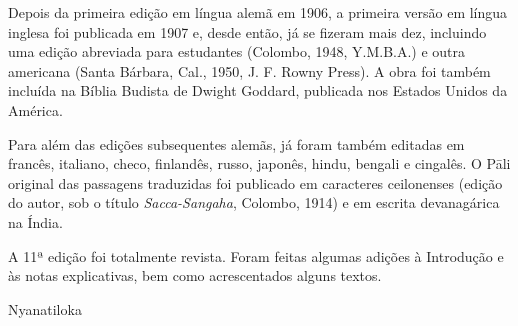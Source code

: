 Depois da primeira edição em língua alemã em 1906, a primeira versão em língua
inglesa foi publicada em 1907 e, desde então, já se fizeram mais dez, incluindo
uma edição abreviada para estudantes (Colombo, 1948, Y.M.B.A.) e outra americana
(Santa Bárbara, Cal., 1950, J. F. Rowny Press). A obra foi também incluída na
Bíblia Budista de Dwight Goddard, publicada nos Estados Unidos da América.

Para além das edições subsequentes alemãs, já foram também editadas em francês,
italiano, checo, finlandês, russo, japonês, hindu, bengali e cingalês. O Pāli
original das passagens traduzidas foi publicado em caracteres ceilonenses
(edição do autor, sob o título \emph{Sacca-Sangaha}, Colombo, 1914) e em escrita
devanagárica na Índia.

A 11ª edição foi totalmente revista. Foram feitas algumas adições à Introdução e
às notas explicativas, bem como acrescentados alguns textos.

\bigskip

{\raggedright
  Nyanatiloka
\par}
